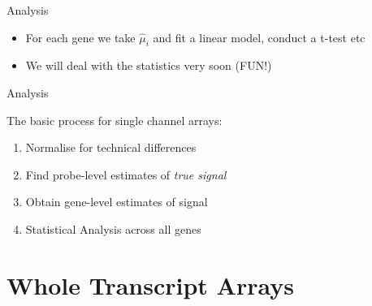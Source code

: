 \documentclass[aspectratio=169,11pt]{beamer}
\begin{document}
\begin{frame}{Analysis}

	\begin{itemize}
		\item For each gene we take $\hat{\mu}_{i}$ and fit a linear model, conduct a t-test etc
		\item We will deal with the statistics very soon (FUN!)
	\end{itemize}
	
\end{frame}

\begin{frame}{Analysis}
	
The basic process for single channel arrays:

	\begin{enumerate}
		\item Normalise for technical differences
		\item Find probe-level estimates of \textit{true signal}
		\item Obtain gene-level estimates of signal
		\item Statistical Analysis across all genes
	\end{enumerate}

\end{frame}

\section{Whole Transcript Arrays}
\end{document}
